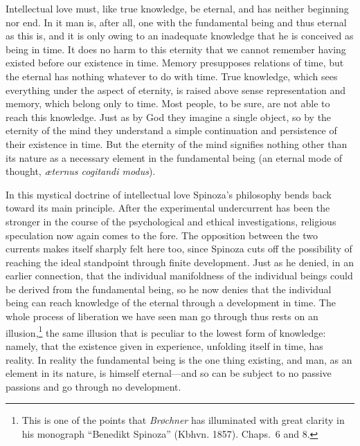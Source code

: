 \documentclass[12pt]{book}
\newcommand{\opage}[1]{\marginnote{\footnotesize\textit{[#1]}}}
\begin{document}
\opage{142}Intellectual love must, like true knowledge, be eternal, and has neither
beginning nor end. In it man is, after all, one with the fundamental being and thus
eternal as this is, and it is only owing to an inadequate knowledge that he is conceived
as being in time. It does no harm to this eternity that we cannot remember having existed
before our existence in time. Memory presupposes relations of time, but the eternal has
nothing whatever to do with time. True knowledge, which sees everything under the aspect
of eternity, is raised above sense representation and memory, which belong only to time.
Most people, to be sure, are not able to reach this knowledge. Just as by God they imagine
a single object, so by the eternity of the mind they understand a simple continuation and
persistence of their existence in time. But the eternity of the mind signifies nothing
other than its nature as a necessary element in the fundamental being (an eternal mode of
thought, \textit{æternus cogitandi modus}).

In this mystical doctrine of intellectual love Spinoza's philosophy bends back toward its
main principle. After the experimental undercurrent has been the stronger in the course
of the psychological and ethical investigations, religious speculation now again comes to
the fore. The opposition between the two currents makes itself sharply felt here too,
since Spinoza cuts off the possibility of reaching the ideal standpoint through finite
development. Just as \opage{143}he denied, in an earlier connection, that the individual
manifoldness of the individual beings could be derived from the fundamental being, so he
now denies that the individual being can reach knowledge of the eternal through a
development in time. The whole process of liberation we have seen man go through thus
rests on an illusion,\footnote{This is one of the points that \emph{Brøchner} has
illuminated with great clarity in his monograph ``Benedikt Spinoza'' (Kbhvn. 1857).
Chaps.~6 and 8.} the same illusion that is peculiar to the lowest form of knowledge:
namely, that the existence given in experience, unfolding itself in time, has reality.
In reality the fundamental being is the one thing existing, and man, as an element in its
nature, is himself eternal---and so can be subject to no passive passions and go through
no development.
\end{document}
